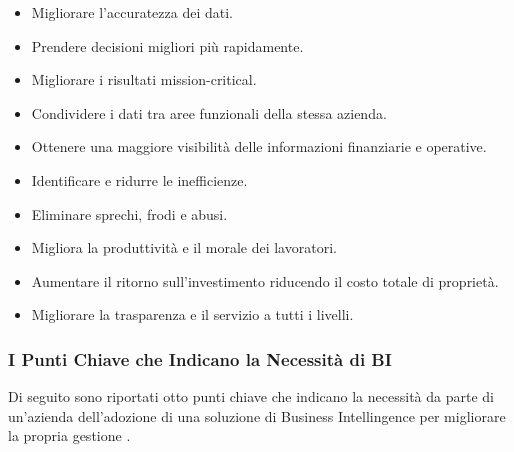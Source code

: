 \begin{itemize}
    \item Migliorare l'accuratezza dei dati.
    \item Prendere decisioni migliori più rapidamente.
    \item Migliorare i risultati mission-critical.
    \item Condividere i dati tra aree funzionali della stessa azienda.
    \item Ottenere una maggiore visibilità delle informazioni finanziarie e operative.
    \item Identificare e ridurre le inefficienze.
    \item Eliminare sprechi, frodi e abusi.
    \item Migliora la produttività e il morale dei lavoratori.
    \item Aumentare il ritorno sull'investimento riducendo il costo totale di proprietà.
    \item Migliorare la trasparenza e il servizio a tutti i livelli.
\end{itemize}

\subsubsection{I Punti Chiave che Indicano la Necessità di BI}

Di seguito sono riportati otto punti chiave che indicano la necessità da parte di un'azienda dell'adozione di una soluzione di Business Intellingence per migliorare la propria gestione \cite{boomper_book_of_bi}.

